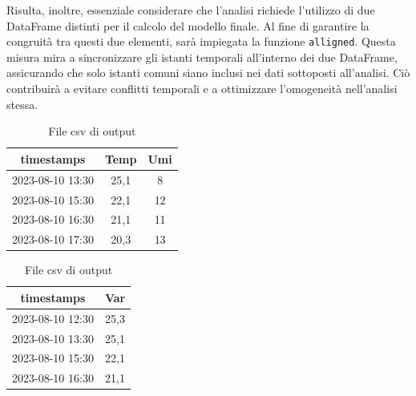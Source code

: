 \documentclass{rapportECL}
\begin{document}
Risulta, inoltre, essenziale considerare che l'analisi richiede l'utilizzo di due DataFrame distinti per il calcolo del modello finale. 
Al fine di garantire la congruità tra questi due elementi, sarà impiegata la funzione \texttt{alligned}. Questa misura mira a sincronizzare 
gli istanti temporali all'interno dei due DataFrame, assicurando che solo istanti comuni siano inclusi nei dati sottoposti all'analisi. 
Ciò contribuirà a evitare conflitti temporali e a ottimizzare l'omogeneità nell'analisi stessa.

\begin{table}[htp]
  \begin{minipage}{0.45\textwidth} %
    \centering
    \begin{tabular}{|c|c|c|}

      \hline
      timestamps & Temp & Umi\\
      \hline
      2023-08-10 13:30 & 25,1 & 8\\
      \hline
      2023-08-10 15:30 & 22,1 & 12\\
      \hline
      2023-08-10 16:30 & 21,1 & 11\\
      \hline
      2023-08-10 17:30 & 20,3 & 13\\
      \hline
    
    \end{tabular}
    
    \caption{File csv di input}
  \end{minipage}
  \hfill %
  \begin{minipage}{0.45\textwidth} %
    \centering
    \begin{tabular}{|c|c|}

      \hline
      timestamps & Var\\
      \hline
      2023-08-10 12:30 & 25,3\\
      \hline
      2023-08-10 13:30 & 25,1\\
      \hline
      2023-08-10 15:30 & 22,1\\
      \hline
      2023-08-10 16:30 & 21,1\\
      \hline
      
    
    \end{tabular}
    
    \caption{File csv di output}
  \end{minipage}
\end{table}
\end{document}
